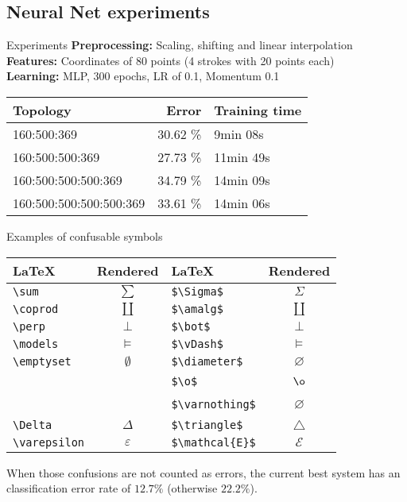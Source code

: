\subsection{Neural Net experiments}
\begin{frame}{Experiments}
    \textbf{Preprocessing:} Scaling, shifting and linear interpolation\\
    \textbf{Features:} Coordinates of 80 points (4 strokes with 20 points each)\\
    \textbf{Learning:} MLP, 300 epochs, LR of 0.1, Momentum 0.1

\begin{table}[h]
    \begin{tabular}{lrl}
    \toprule
    Topology                & Error    & Training time \\ \midrule
    160:500:369             & 30.62 \% & \hphantom{0}9min 08s      \\
    160:500:500:369         & 27.73 \% & 11min 49s     \\
    160:500:500:500:369     & 34.79 \% & 14min 09s     \\
    160:500:500:500:500:369 & 33.61 \% & 14min 06s     \\
    \bottomrule
    \end{tabular}
\end{table}

\end{frame}

\begin{frame}[fragile]{Examples of confusable symbols}
\begin{table}[ht]
    \centering
    \begin{tabular}{lc|lc}
        \textbf{\LaTeX}& \textbf{Rendered}   & \textbf{\LaTeX}& \textbf{Rendered} \\\midrule
        \verb+\sum+    & $\sum$         & \verb+$\Sigma$+        & $\Sigma$\\
        \verb+\coprod+ & $\coprod$      & \verb+$\amalg$+        & $\amalg$\\
        \verb+\perp+   & $\perp$        & \verb+$\bot$+          & $\bot$\\
        \verb+\models+ & $\models$      & \verb+$\vDash$+        & $\vDash$\\
        \verb+\emptyset+ & $\emptyset$  & \verb+$\diameter$+     & $\diameter$\\
        ~              & ~              & \verb+$\o$+            & $\o$\\
        ~              & ~              & \verb+$\varnothing$+   & $\varnothing$\\
        \verb+\Delta+  & $\Delta$       & \verb+$\triangle$+     & $\triangle$\\
        \verb+\varepsilon+ & $\varepsilon$ & \verb+$\mathcal{E}$+ & $\mathcal{E}$\\
    \end{tabular}
\end{table}

When those confusions are not counted as errors, the current best system
has an classification error rate of $12.7 \%$ (otherwise $22.2 \%$).

\end{frame}